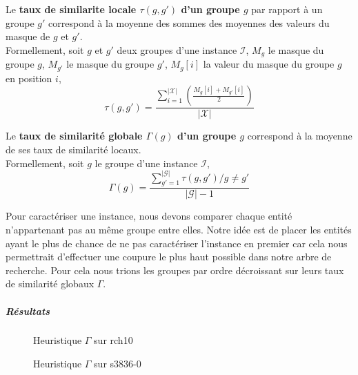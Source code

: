 \begin{definition}
Le \textbf{taux de similarite locale $\tau(g,g')$ d'un groupe $g$} par rapport à un groupe $g'$ correspond à la moyenne des sommes des moyennes des valeurs du masque de $g$ et $g'$.\\
Formellement, soit $g$ et $g'$ deux groupes d'une instance $\mathcal{I}$, $M_g$ le masque du groupe $g$, $M_{g'}$ le masque du groupe $g'$, $M_g[i]$ la valeur du masque du groupe $g$ en position $i$,
$$ \tau(g,g')= \frac{\sum_{i=1}^{|\mathcal{X}|}(\frac{M_g[i]+M_{g'}[i]}{2})}{|\mathcal{X}|}$$
\end{definition}

\begin{definition}
Le \textbf{taux de similarité globale $\Gamma(g)$ d'un groupe $g$} correspond à la moyenne de ses taux de similarité locaux.\\
Formellement, soit $g$ le groupe d'une instance $\mathcal{I}$,
$$ \Gamma(g)=\frac{\sum_{g'=1}^{|\mathcal{G}|}\tau(g,g') /g \neq g'}{|\mathcal{G}|-1} $$
\end{definition}

Pour caractériser une instance, nous devons comparer chaque entité n'appartenant pas au même groupe entre elles. Notre idée est de placer les entités ayant le plus de chance de ne pas caractériser l'instance en premier car cela nous permettrait d'effectuer une coupure le plus haut possible dans notre arbre de recherche. Pour cela nous trions les groupes par ordre décroissant sur leurs taux de similarité globaux $\Gamma$.



\subparagraph{Résultats}

\begin{figure}[H]
\centering
	\begin{minipage}[c]{0.49\linewidth}
	\centering
	
	\end{minipage}
	\begin{minipage}[c]{0.49\linewidth}
	\centering
	
	\end{minipage}
\caption{Heuristique $\Gamma$ sur rch10}
\end{figure}

\begin{figure}[H]
\centering
	\begin{minipage}[c]{0.49\linewidth}
	\centering
	
	\end{minipage}
	\begin{minipage}[c]{0.49\linewidth}
	\centering
	
	\end{minipage}
\caption{Heuristique $\Gamma$ sur s3836-0}
\end{figure}

